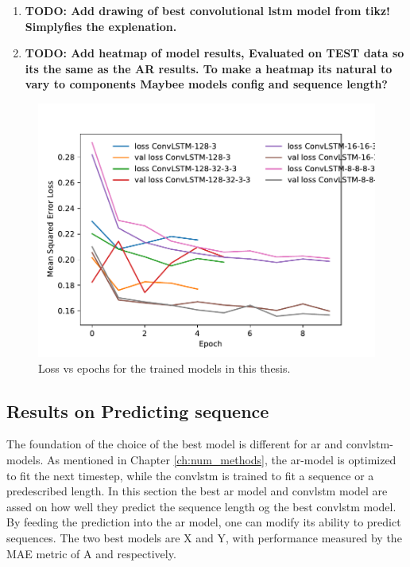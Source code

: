 \begin{enumerate}
    \item \textbf{TODO: Add drawing of best convolutional lstm model from tikz! Simplyfies the explenation.}
    \item \textbf{TODO: Add heatmap of model results, Evaluated on TEST data so its the same as the AR results. To make a heatmap its natural to vary to components Maybee models config and sequence length?}
\end{enumerate}

\begin{figure}
    \centering
    \includegraphics{python_figs/test_epoch_loss.pdf}
    \caption{Loss vs epochs for the trained models in this thesis. }
    \label{fig:mse_loss}
\end{figure}


\subsection{Results on Predicting sequence}
The foundation of the choice of the best model is different for \acrshort{ar} and \acrshort{convlstm}-models. As mentioned in Chapter \ref{ch:num_methods}, the \acrshort{ar}-model is optimized to fit the next timestep, while the \acrshort{convlstm} is trained to fit a sequence or a predescribed length. In this section the best ar model and convlstm model are assed on how well they predict the sequence length og the best convlstm model. By feeding the prediction into the ar model, one can modify its ability to predict sequences. The two best models are X and Y, with performance measured by the MAE metric of A and respectively. 

